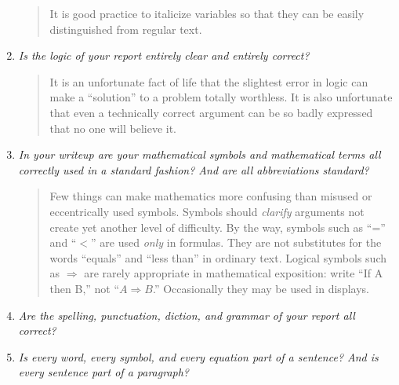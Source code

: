\begin{enumerate}
\begin{quote}
\vspace{5pt}

It is good practice to italicize variables so that they can be easily distinguished from
regular text.
      \end{quote}

\vspace{15pt}

   \item \emph{Is the logic of your report entirely clear and entirely correct?}

\vspace{10pt}

     \begin{quote}
It is an unfortunate fact of life that the slightest error in logic can make a ``solution'' to
a problem totally worthless.  It is also unfortunate that even a technically correct argument
can be so badly expressed that no one will believe it.
     \end{quote}

\vspace{15pt}

   \item \emph{In your writeup are your mathematical symbols and mathematical terms all correctly
used in a standard fashion? And are all abbreviations standard?}

\vspace{10pt}

     \begin{quote}
Few things can make mathematics more confusing than misused or eccentrically used symbols.
Symbols should \emph{clarify} arguments not create yet another level of difficulty.  By the
way, symbols such as ``='' and ``$<$'' are used \emph{only} in formulas. They are not
substitutes for the words ``equals'' and ``less than'' in ordinary text.  Logical symbols such
as $\Rightarrow$ are rarely appropriate in mathematical exposition: write ``If A then B,'' not
``$A \Rightarrow B$.''  Occasionally they may be used in displays.
     \end{quote}

\vspace{15pt}

   \item \emph{Are the spelling, punctuation, diction, and grammar of your report all correct?}

\vspace{15pt}

   \item \emph{Is every word, every symbol, and every equation part of a sentence?  And is every
sentence part of a paragraph?}


\end{enumerate}
